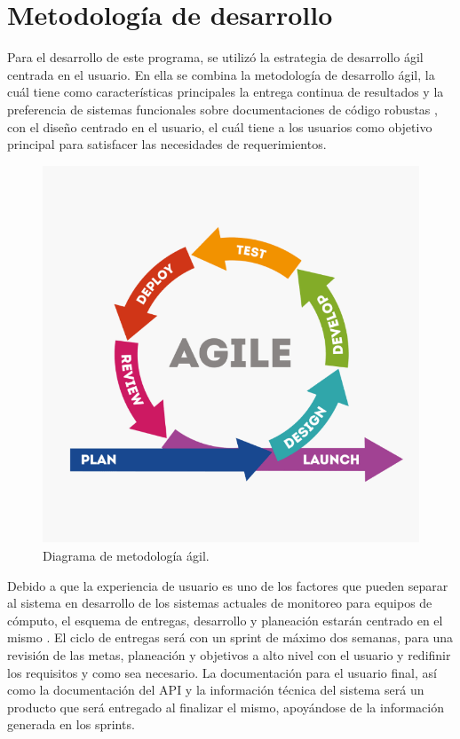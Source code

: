 \section{Metodología de desarrollo}


Para el desarrollo de este programa, se utilizó la estrategia de desarrollo ágil centrada en el usuario. En ella se combina la metodología de desarrollo ágil, la cuál tiene como características principales la entrega continua de resultados y la preferencia de sistemas funcionales sobre documentaciones de código robustas \cite{agile_manifesto}, con el diseño centrado en el usuario, el cuál tiene a los usuarios como objetivo principal para satisfacer las necesidades de requerimientos.

\begin{figure}[!ht]
	\centering
	\includegraphics[width=.75\linewidth]{images/agil.png}
	\caption{Diagrama de metodología ágil.}
	\label{fig:agile_methodology}
\end{figure}

Debido a que la experiencia de usuario es uno de los factores que pueden separar al sistema en desarrollo de los sistemas actuales de monitoreo para equipos de cómputo, el esquema de entregas, desarrollo y planeación estarán centrado en el mismo \cite{hussain_agile_usercentered}. El ciclo de entregas será con un sprint de máximo dos semanas, para una revisión de las metas, planeación y objetivos a alto nivel con el usuario y redifinir los requisitos y como sea necesario. La documentación para el usuario final, así como la documentación del API y la información técnica del sistema será un producto que será entregado al finalizar el mismo, apoyándose de la información generada en los sprints.

